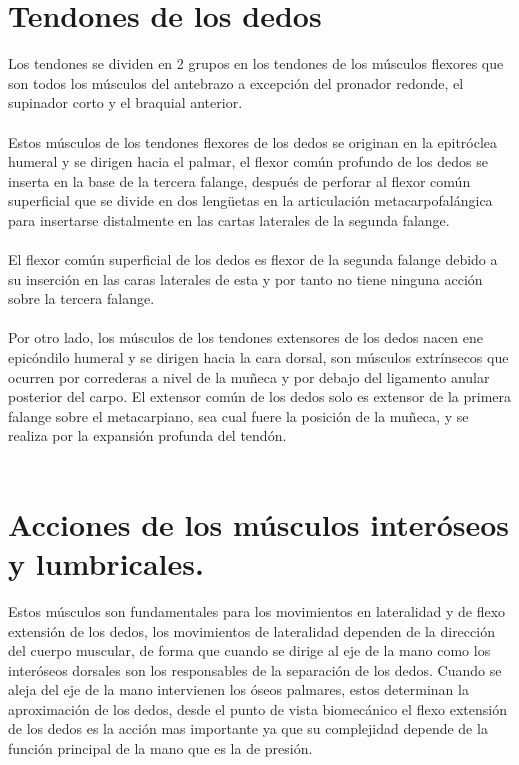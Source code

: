 \documentclass{article}
\begin{document}
\section{Tendones de los dedos}
Los tendones se dividen en 2 grupos en los tendones de los músculos flexores que son todos los músculos del antebrazo a excepción del pronador redonde, el supinador corto y el braquial anterior.\\
\\
Estos músculos de los tendones flexores de los dedos se originan en la epitróclea humeral y se dirigen hacia el palmar, el flexor común profundo de los dedos se inserta en la base de la tercera falange, después de perforar al flexor común superficial que se divide en dos lengüetas en la articulación metacarpofalángica para insertarse distalmente en las cartas laterales de la segunda falange.\\
\\
El flexor común superficial de los dedos es flexor de la segunda falange debido a su inserción en las caras laterales de esta y por tanto no tiene ninguna acción sobre la tercera falange.\\
\\
Por otro lado, los músculos de los tendones extensores de los dedos nacen ene epicóndilo humeral y se dirigen hacia la cara dorsal, son músculos extrínsecos que ocurren por correderas a nivel de la muñeca y por debajo del ligamento anular posterior del carpo. El extensor común de los dedos solo es extensor de la primera falange sobre el metacarpiano, sea cual fuere la posición de la muñeca, y se realiza por la expansión profunda del tendón.\\
\\

\section{Acciones de los músculos interóseos y lumbricales.}
Estos músculos son fundamentales para los movimientos en lateralidad y de flexo extensión de los dedos, los movimientos de lateralidad dependen de la dirección del cuerpo muscular, de forma que cuando se dirige al eje de la mano como los interóseos dorsales son los responsables de la separación de los dedos.
Cuando se aleja del eje de la mano intervienen los óseos palmares, estos determinan la aproximación de los dedos, desde el punto de vista biomecánico el flexo extensión de los dedos es la acción mas importante ya que su complejidad depende de la función principal de la mano que es la de presión.\\
\\
\end{document}
